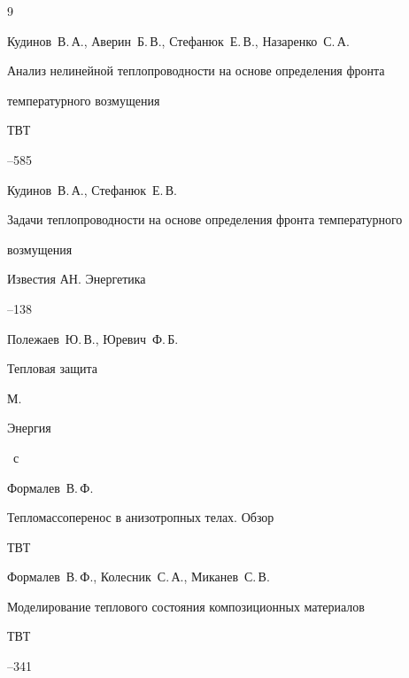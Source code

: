 \begin{thebibliography}{9}




\by Кудинов~В.\,А., Аверин~Б.\,В., Стефанюк~Е.\,В., Назаренко~С.\,А.

\paper Анализ нелинейной теплопроводности на основе определения фронта

температурного возмущения

\jour ТВТ




--585




\by  Кудинов~В.\,А., Стефанюк~Е.\,В.

\paper Задачи теплопроводности на основе определения фронта температурного

возмущения

\jour Известия АН. Энергетика



--138




\by Полежаев~Ю.\,В., Юревич~Ф.\,Б.

\book Тепловая защита

\publaddr М.

\publ Энергия


~с




\by Формалев~В.\,Ф.

\paper Тепломассоперенос в анизотропных телах. Обзор

\jour ТВТ








\by Формалев~В.\,Ф., Колесник~С.\,А., Миканев~С.\,В.

\paper Моделирование теплового состояния композиционных материалов

\jour ТВТ




--341



\end{thebibliography}





\makeengtitlem





%


